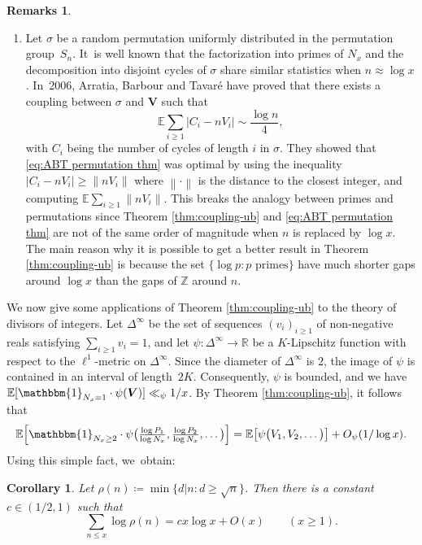 \documentclass[JEP,XML,SOM,Unicode,published]{cedram}
\newenvironment{enumeratea}
{\bgroup\def\theenumi{\alph{enumi}}\begin{enumerate}}
{\end{enumerate}\egroup}
\newcommand{\bV}{{\boldsymbol V}}
\newcommand{\ZZ}{\mathbb{Z}}
\newcommand{\RR}{\mathbb{R}}
\newcommand{\EE}{\mathbb{E}}
\newcommand{\one}{\mathbbm{1}}
\newcommand{\bg}{\big}
\newcommand{\bgg}{\Big}
\theoremstyle{plain}
\newtheorem{cor}{Corollary}[section]
\theoremstyle{definition}
\newtheorem*{remss}{Remarks}
\begin{document}
\begin{remss}
\begin{enumeratea}
\item\label{rem:d}
Let $\sigma$ be a random permutation uniformly distributed in the permutation group~$S_n$. It~is well known that the factorization into primes of $N_x$ and the decomposition into disjoint cycles of $\sigma$ share similar statistics when $n \approx \log x$. In~2006, Arratia, Barbour and Tavaré \cite{ABT06} have proved that there exists a coupling between $\sigma$ and $\bV$ such that
\begin{equation}
\label{eq:ABT permutation thm}
\EE \sum_{i \ge 1} |C_i - n V_i| \sim \frac{\log n}{4},
\end{equation}
with $C_i$ being the number of cycles of length $i$ in $\sigma$. They showed that \eqref{eq:ABT permutation thm} was optimal by using the inequality $|C_i - nV_i| \ge \|nV_i\|$ where $\left\|\cdot\right\|$ is the distance to the closest integer, and computing $\EE \sum_{i \ge 1} \|nV_i\|$. This breaks the analogy between primes and permutations since Theorem \ref{thm:coupling-ub} and \eqref{eq:ABT permutation thm} are not of the same order of magnitude when $n$ is replaced by $\log x$. The main reason why it is possible to get a better result in Theorem \ref{thm:coupling-ub} is because the set $\{\log p : p \text{ primes}\}$ have much shorter gaps around $\log x$ than the gaps of $\ZZ$ around $n$.
\end{enumeratea}
\end{remss}


We now give some applications of Theorem \ref{thm:coupling-ub} to the theory of divisors of integers.
Let $\Delta^{\infty}$ be the set of sequences $(v_i)_{i \ge 1}$ of non-negative reals satisfying $\sum_{i \ge 1} v_i = 1$, and let $\psi\colon \Delta^{\infty} \to \RR$ be a $K$-Lipschitz function with respect to the $\ell^1$-metric on $\Delta^\infty$. Since the diameter of $\Delta^\infty$ is $2$, the image of $\psi$ is contained in an interval of length~$2K$. Consequently, $\psi$ is bounded, and we have $\EE[\one_{N_x = 1}\cdot \psi(\bV)] \ll_{\psi} 1/x$. By Theorem \ref{thm:coupling-ub}, it follows that
\begin{equation}
\label{eq:dual wasserstein}
\EE\bgg[\one_{N_x \ge 2}\cdot \psi\bg(\tfrac{\log P_1}{\log N_x}, \tfrac{\log P_2}{\log N_x}, \ldots\bg)\bgg] = \EE\bg[\psi\bg(V_1, V_2, \ldots\bg)\bg] + O_\psi(1/\log x).
\end{equation}
Using this simple fact, we~obtain:
\begin{cor}
Let $\rho(n) \coloneqq \min\{d|n : d\ge \sqrt n\}$. Then there is a constant $c \in (1/2,1)$ such that
\[
\sum_{n\le x} \log \rho(n) = cx\log x + O(x) \qquad (x \ge 1).
\]
\end{cor}
\end{document}
